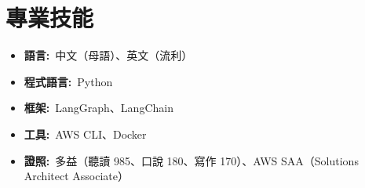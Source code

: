 \documentclass[11pt,a4paper]{article}
\begin{document}
\section{專業技能}
\begin{itemize}[label={},leftmargin=0pt,itemsep=0.7mm]
  \item \textbf{語言:}\ 中文（母語）、英文（流利）
  \item \textbf{程式語言:}\ Python
  \item \textbf{框架:}\ LangGraph、LangChain
  \item \textbf{工具:}\ AWS CLI、Docker
  \item \textbf{證照:}\ 多益（聽讀 985、口說 180、寫作 170）、AWS SAA（Solutions Architect Associate）
\end{itemize}
\end{document}
